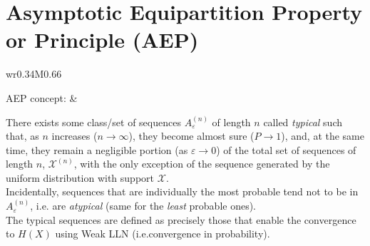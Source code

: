 \documentclass[10pt]{homework}
\newenvironment{mytable}
    { %
        \bgroup
        \centering
        \def\arraystretch{2.3}%
        \begin{longtable}{wr{0.34\textwidth}M{0.66\textwidth}}
    }
    { %
        \end{longtable}
        \egroup
    }
\newenvironment{mytextcol}
    { %
        \begin{minipage}[t]{0.6\textwidth}
    }
    { %
        \end{minipage}
    }
\begin{document}
\newpage
\section*{Asymptotic Equipartition Property or Principle (AEP)}
\begin{mytable}
AEP concept: &
\begin{mytextcol}
  There exists some class/set of sequences $A_\varepsilon^{(n)}$ of length $n$ called \emph{typical} such that, as $n$ increases ($n\to\infty$), they become almost sure ($P\to 1$), and, at the same time, they remain a negligible portion (as $\varepsilon\to 0$) of the total set of sequences of length $n$, $\mathcal X^{(n)}$, with the only exception of the sequence generated by the uniform distribution with support $\mathcal X$.\\
  Incidentally, sequences that are individually the most probable tend not to be in $A_\varepsilon^{(n)}$, i.e. are \emph{atypical} (same for the \emph{least} probable ones).
  \\
  The typical sequences are defined as precisely those that enable the convergence to $H(X)$ using Weak LLN (i.e.\@ convergence in probability).


\end{mytextcol}
\end{mytable}
\end{document}
